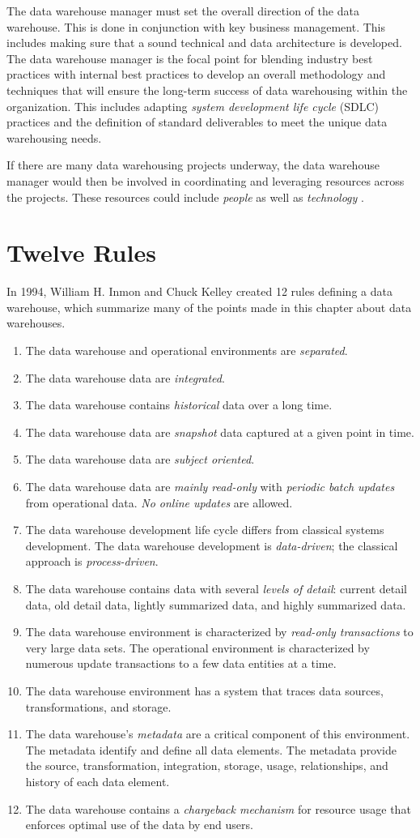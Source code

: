 \documentclass{vldb}
\newcommand{\be}{\begin{enumerate}}
\newcommand{\ee}{\end{enumerate}}
\newcommand{\ii}{\item}
\begin{document}
The data warehouse manager must set the overall direction of the data warehouse. This is done in conjunction with key business management. This includes making sure that a sound technical and data architecture is developed. The data warehouse manager is the focal point for blending industry best practices with internal best practices to develop an overall methodology and techniques that will ensure the long-term success of data warehousing within the organization. This includes adapting \textit{system development life cycle} (SDLC) practices and the definition of standard deliverables to meet the unique data warehousing needs.

If there are many data warehousing projects underway, the data warehouse manager would then be involved in coordinating and leveraging resources across the projects. These resources could include \textit{people} as well as \textit{technology} .

\section{Twelve Rules} %
In 1994, William H. Inmon and Chuck Kelley created 12 rules defining a data warehouse, which summarize many of
the points made in this chapter about data warehouses.
\be
\ii The data warehouse and operational environments are \textit{separated}.
\ii The data warehouse data are \textit{integrated}.
\ii The data warehouse contains \textit{historical} data over a long time.
\ii The data warehouse data are \textit{snapshot} data captured at a given point in time.
\ii The data warehouse data are \textit{subject oriented}.
\ii The data warehouse data are \textit{mainly read-only} with \textit{periodic batch updates} from operational data. \textit{No online updates} are allowed.
\ii The data warehouse development life cycle differs from classical systems development. The data warehouse development is \textit{data-driven}; the classical approach is \textit{process-driven}.
\ii The data warehouse contains data with several \textit{levels of detail}: current detail data, old detail data, lightly
summarized data, and highly summarized data.
\ii The data warehouse environment is characterized by \textit{read-only transactions} to very large data sets. The
operational environment is characterized by numerous update transactions to a few data entities at a time.
\ii The data warehouse environment has a system that traces data sources, transformations, and storage.
\ii The data warehouse’s \textit{metadata} are a critical component of this environment. The metadata identify and define
all data elements. The metadata provide the source, transformation, integration, storage, usage, relationships,
and history of each data element.
\ii The data warehouse contains a \textit{chargeback mechanism} for resource usage that enforces optimal use of the data
by end users.
\ee
\end{document}
